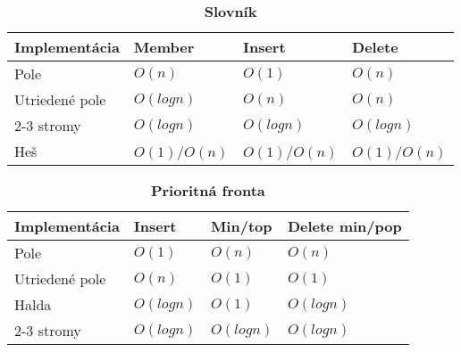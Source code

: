 		
		\begin{table}[h]
			\centering
			\caption{\textbf{Slovník}}
			\label{my-label}
			\begin{tabular}{|l|l|l|l|}
			\hline
			\textbf{Implementácia} & \textbf{Member} & \textbf{Insert} & \textbf{Delete}  \\ \hline
			Pole                   & $O(n)$            & $O(1)$           & $O(n)$             \\ \hline
			Utriedené pole         & $O(log n)$        & $O(n)$            & $O(n)$             \\ \hline
			2-3 stromy             & $O(log n)$        & $O(log n)$        & $O(log n)$          \\ \hline
			Heš                    & $O(1)$/$O(n)$      & $O(1)$/$O(n)$       & $O(1)$/$O(n)$        \\ \hline
			\end{tabular}
		\end{table}

		\begin{table}[h]
			\centering
			\caption{\textbf{Prioritná fronta}}
			\label{my-label}
			\begin{tabular}{|l|l|l|l|}
			\hline
			\textbf{Implementácia} & \textbf{Insert} & \textbf{Min/top} & \textbf{Delete min/pop}   \\ \hline
			Pole                   & $O(1)$            & $O(n)$             & $O(n)$                       \\ \hline
			Utriedené pole         & $O(n)$            & $O(1)$             & $O(1)$                       \\ \hline
			Halda                  & $O(log n)$        & $O(1)$             & $O(log n)$                  \\ \hline
			2-3 stromy             & $O(log n)$        & $O(log n)$         & $O(log n)$                   \\ \hline
			\end{tabular}
		\end{table}
